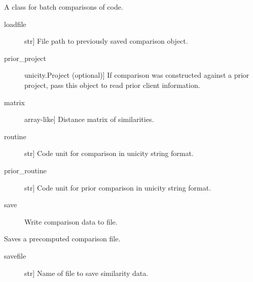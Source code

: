 \documentclass[letterpaper,10pt,english]{sphinxmanual}
\begin{document}

\begin{fulllineitems}
\label{\detokenize{index:unicity.Comparison}}
A class for batch comparisons of code.
\begin{description}
\item[{loadfile}] \leavevmode{[}str{]}
File path to previously saved comparison object.

\item[{prior\_project}] \leavevmode{[}unicity.Project (optional){]}
If comparison was constructed against a prior project, pass this
object to read prior client information.

\end{description}
\begin{description}
\item[{matrix}] \leavevmode{[}array-like{]}
Distance matrix of similarities.

\item[{routine}] \leavevmode{[}str{]}
Code unit for comparison in unicity string format.

\item[{prior\_routine}] \leavevmode{[}str{]}
Code unit for prior comparison in unicity string format.

\end{description}
\begin{description}
\item[{save }] \leavevmode
Write comparison data to file.

\end{description}

\begin{fulllineitems}
\label{\detokenize{index:unicity.Comparison.save}}
Saves a precomputed comparison file.
\begin{description}
\item[{savefile}] \leavevmode{[}str{]}
Name of file to save similarity data.

\end{description}

\end{fulllineitems}


\end{fulllineitems}
\end{document}
